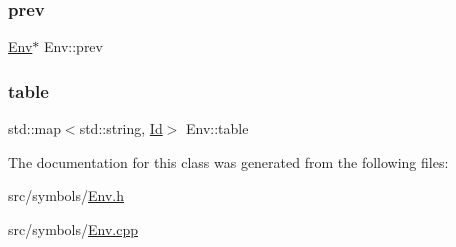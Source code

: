 \subsubsection{\texorpdfstring{prev}{prev}}
{\footnotesize\ttfamily \hyperlink{class_env}{Env}$\ast$ Env\+::prev\hspace{0.3cm}{\ttfamily [protected]}}

\mbox{\label{class_env_ab93397b135a614cb1c7e6057a00a8d85}} 
\subsubsection{\texorpdfstring{table}{table}}
{\footnotesize\ttfamily std\+::map$<$std\+::string, \hyperlink{class_id}{Id}$>$ Env\+::table\hspace{0.3cm}{\ttfamily [private]}}



The documentation for this class was generated from the following files\+:\begin{DoxyCompactItemize}
\item 
src/symbols/\hyperlink{_env_8h}{Env.\+h}\item 
src/symbols/\hyperlink{_env_8cpp}{Env.\+cpp}\end{DoxyCompactItemize}
